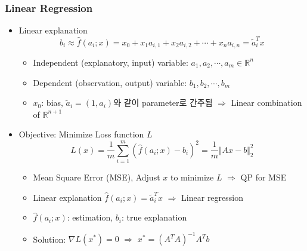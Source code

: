 \subsubsection*{Linear Regression}
\begin{itemize}
    \item Linear explanation
    \begin{equation}
        b_i\approx\hat{f}(a_i;x)=x_0+x_1a_{i,1}+x_2a_{i,2}+\cdots+x_na_{i,n}=\tilde{a}_i^Tx
    \end{equation}
    \begin{itemize}
        \item Independent (explanatory, input) variable: $a_1,a_2,\cdots,a_m\in\mathbb{R}^n$
        \item Dependent (observation, output) variable: $b_1,b_2,\cdots,b_m$
        \item $x_0$: bias, $\tilde{a}_i=(1,a_i)$와 같이 parameter로 간주됨 $\Rightarrow$ Linear combination of $\mathbb{R}^{n+1}$
    \end{itemize}
    \item Objective: Minimize Loss function $L$
    \begin{equation}
        L(x)=\frac{1}{m}\sum_{i=1}^{m}\left(\hat{f}(a_i;x)-b_i\right)^2 = \frac{1}{m}\Vert Ax-b\Vert_2^2
    \end{equation}
    \begin{itemize}
        \item Mean Square Error (MSE), Adjust $x$ to minimize $L$ $\Rightarrow$ QP for MSE
        \item Linear explanation $\hat{f}(a_i;x)=\tilde{a}_i^Tx$ $\Rightarrow$ Linear regression
        \item $\hat{f}(a_i;x)$: estimation, $b_i$: true explanation
        \item Solution: $\nabla L(x^\ast)=0$ $\Rightarrow$ $x^\ast=(A^TA)^{-1}A^Tb$
    \end{itemize}
\end{itemize}

